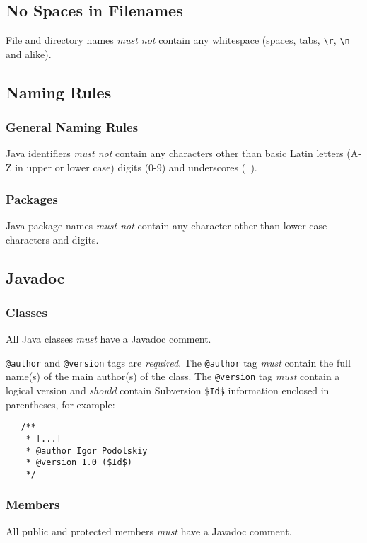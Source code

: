\documentclass[a4paper,12pt,liststotoc,DIV12]{scrartcl}
\begin{document}
\subsection{No Spaces in Filenames}
File and directory names \emph{must not} contain any whitespace (spaces, tabs,
\verb!\r!, \verb!\n! and alike).

\subsection{Naming Rules}
\label{sec:general:naming-rules}

\subsubsection{General Naming Rules}
\label{sec:general-naming-rules}
Java identifiers \emph{must not} contain any characters other than basic Latin
letters (A-Z in upper or lower case) digits (0-9) and underscores
(\texttt{\_}).

\subsubsection{Packages}
\label{sec:naming:packages}
Java package names \emph{must not} contain any character other than lower
case characters and digits.

\subsection{Javadoc}
\label{sec:general:javadoc}

\subsubsection{Classes}
\label{sec:general:javadoc:classes}
All Java classes \emph{must} have a Javadoc comment.

\texttt{@author} and \texttt{@version} tags are \emph{required}. The
\texttt{@author} tag \emph{must} contain the full name(s) of the main author(s)
of the class. The \texttt{@version} tag \emph{must} contain a logical version
and \emph{should} contain Subversion \texttt{\$Id\$} information enclosed in
parentheses, for example:

\begin{verbatim}
   /**
    * [...]
    * @author Igor Podolskiy
    * @version 1.0 ($Id$) 
    */
\end{verbatim}

\subsubsection{Members}
All public and protected members \emph{must} have a Javadoc
comment.
\end{document}
